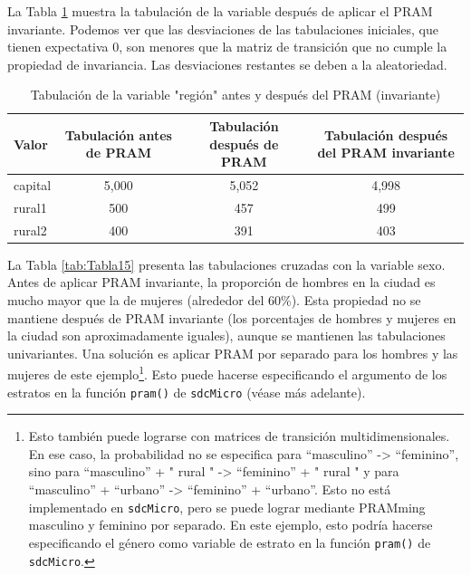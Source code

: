 \documentclass[]{book}
\theoremstyle{definition}
\theoremstyle{definition}
\theoremstyle{definition}
\theoremstyle{definition}
\theoremstyle{remark}
\begin{document}
La Tabla \ref{tab:Tabla14} muestra la tabulación de la variable después de aplicar el PRAM invariante. Podemos ver que las desviaciones de las tabulaciones iniciales, que tienen expectativa 0, son menores que la matriz de transición que no cumple la propiedad de invariancia. Las desviaciones restantes se deben a la aleatoriedad.

\begin{table}

\caption{\label{tab:Tabla14}\label{tab:Tabla14}Tabulación de la variable "región" antes y después del PRAM (invariante)}
\centering
\begin{tabular}[t]{lccc}
\toprule
Valor & Tabulación antes de PRAM & Tabulación después de PRAM & Tabulación después del PRAM invariante\\
\midrule
capital & 5,000 & 5,052 & 4,998\\
rural1 & 500 & 457 & 499\\
rural2 & 400 & 391 & 403\\
\bottomrule
\end{tabular}
\end{table}

La Tabla \ref{tab:Tabla15} presenta las tabulaciones cruzadas con la variable sexo. Antes de aplicar PRAM invariante, la proporción de hombres en la ciudad es mucho mayor que la de mujeres (alrededor del 60\%). Esta propiedad no se mantiene después de PRAM invariante (los porcentajes de hombres y mujeres en la ciudad son aproximadamente iguales), aunque se mantienen las tabulaciones univariantes. Una solución es aplicar PRAM por separado para los hombres y las mujeres de este ejemplo\footnote{Esto también puede lograrse con matrices de transición multidimensionales. En ese caso, la probabilidad no se especifica para ``masculino'' -\textgreater{} ``feminino'', sino para ``masculino'' + " rural " -\textgreater{} ``feminino'' + " rural " y para ``masculino'' + ``urbano'' -\textgreater{} ``feminino'' + ``urbano''. Esto no está implementado en \texttt{sdcMicro}, pero se puede lograr mediante PRAMming masculino y feminino por separado. En este ejemplo, esto podría hacerse especificando el género como variable de estrato en la función \texttt{pram()} de \texttt{sdcMicro}.}. Esto puede hacerse especificando el argumento de los estratos en la función \texttt{pram()} de \texttt{sdcMicro} (véase más adelante).
\end{document}
